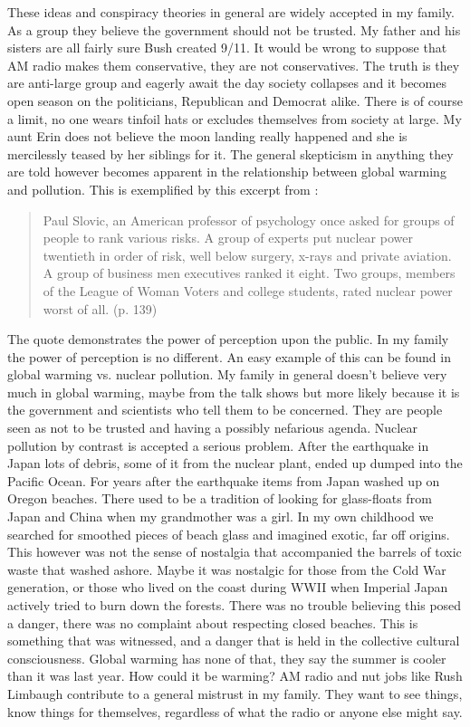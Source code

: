 \documentclass[
    a4paper,
    12pt,
    man,
    donotrepeattitle
]{apa6}
\begin{document}
These ideas and conspiracy theories in general are widely accepted in my
family. As a group they believe the government should not be trusted. My father
and his sisters are all fairly sure Bush created 9/11. It would be wrong to
suppose that AM radio makes them conservative, they are not conservatives. The
truth is they are anti-large group and eagerly await the day society collapses
and it becomes open season on the politicians, Republican and Democrat alike.
There is of course a limit, no one wears tinfoil hats or excludes themselves
from society at large. My aunt Erin does not believe the moon landing really
happened and she is mercilessly teased by her siblings for it. The general
skepticism in anything they are told however becomes apparent in the
relationship between global warming and pollution. This is exemplified by this
excerpt from \textcite{s6}:
\blockquote{Paul Slovic, an American professor of psychology once asked for 
groups of
people to rank various risks. A group of experts put nuclear power twentieth in
order of risk, well below surgery, x-rays and private aviation. A group of
business men executives ranked it eight. Two groups, members of the League of
Woman Voters and college students, rated nuclear power worst of all. (p.
139)}
The quote demonstrates the power of perception upon the public. In my family
the power of perception is no different. An easy example of this can be found
in global warming vs. nuclear pollution. My family in general doesn't believe
very much in global warming, maybe from the talk shows but more likely because
it is the government and scientists who tell them to be concerned. They are
people seen as not to be trusted and having a possibly nefarious agenda.
Nuclear pollution by contrast is accepted a serious problem. After the
earthquake in Japan lots of debris, some of it from the nuclear plant, ended up
dumped into the Pacific Ocean. For years after the earthquake items from Japan
washed up on Oregon beaches. There used to be a tradition of looking for
glass-floats from Japan and China when my grandmother was a girl. In my own
childhood we searched for smoothed pieces of beach glass and imagined exotic,
far off origins. This however was not the sense of nostalgia that accompanied
the barrels of toxic waste that washed ashore. Maybe it was nostalgic for those
from the Cold War generation, or those who lived on the coast during WWII when
Imperial Japan actively tried to burn down the forests. There was no trouble
believing this posed a danger, there was no complaint about respecting closed
beaches. This is something that was witnessed, and a danger that is held in the
collective cultural consciousness. Global warming has none of that, they say
the summer is cooler than it was last year. How could it be warming? AM radio
and nut jobs like Rush Limbaugh contribute to a general mistrust in my family.
They want to see things, know things for themselves, regardless of what the
radio or anyone else might say.
\end{document}

